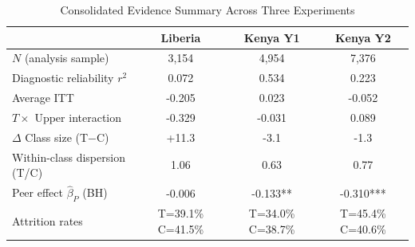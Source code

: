 \begin{table}[htbp]
\centering\small
\caption{Consolidated Evidence Summary Across Three Experiments}
\label{tab:consolidated}
\begin{tabular}{lccc}
\toprule
 & Liberia & Kenya Y1 & Kenya Y2 \\
\midrule
$N$ (analysis sample) & 3,154 & 4,954 & 7,376 \\
Diagnostic reliability $r^2$ & 0.072 & 0.534 & 0.223 \\
Average ITT & -0.205 & 0.023 & -0.052 \\
$T \times$ Upper interaction & -0.329 & -0.031 & 0.089 \\
$\Delta$ Class size (T$-$C) & +11.3 & -3.1 & -1.3 \\
Within-class dispersion (T/C) & 1.06 & 0.63 & 0.77 \\
Peer effect $\hat{\beta}_P$ (BH) & -0.006 & -0.133** & -0.310*** \\
Attrition rates & T=39.1\% C=41.5\% & T=34.0\% C=38.7\% & T=45.4\% C=40.6\% \\
\bottomrule
\end{tabular}
\par\smallskip{}
\end{table}